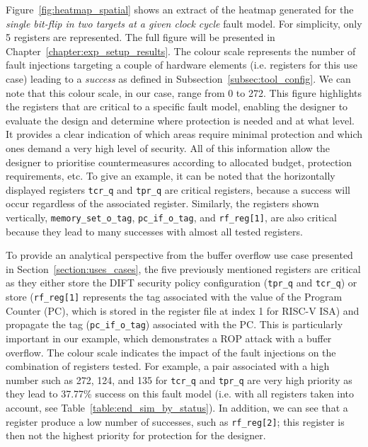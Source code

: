 Figure~\ref{fig:heatmap_spatial} shows an extract of the heatmap generated for the \textit{single bit-flip in two targets at a given clock cycle} fault model. For simplicity, only 5 registers are represented. The full figure will be presented in Chapter~\ref{chapter:exp_setup_results}.
The colour scale represents the number of fault injections targeting a couple of hardware elements (i.e. registers for this use case) leading to a \textit{success} as defined in Subsection~\ref{subsec:tool_config}. We can note that this colour scale, in our case, range from 0 to 272.
This figure highlights the registers that are critical to a specific fault model, enabling the designer to evaluate the design and determine where protection is needed and at what level. It provides a clear indication of which areas require minimal protection and which ones demand a very high level of security. All of this information allow the designer to prioritise countermeasures according to allocated budget, protection requirements, etc.
To give an example, it can be noted that the horizontally displayed registers \texttt{tcr\_q} and \texttt{tpr\_q} are critical registers, because a success will occur regardless of the associated register. Similarly, the registers shown vertically, \texttt{memory\_set\_o\_tag}, \texttt{pc\_if\_o\_tag}, and \texttt{rf\_reg[1]}, are also critical because they lead to many successes with almost all tested registers.

To provide an analytical perspective from the buffer overflow use case presented in Section~\ref{section:uses_cases}, the five previously mentioned registers are critical as they either store the DIFT security policy configuration (\texttt{tpr\_q} and \texttt{tcr\_q}) or store (\texttt{rf\_reg[1]} represents the tag associated with the value of the Program Counter (PC), which is stored in the register file at index 1 for RISC-V ISA) and propagate the tag (\texttt{pc\_if\_o\_tag}) associated with the PC. This is particularly important in our example, which demonstrates a ROP attack with a buffer overflow.
The colour scale indicates the impact of the fault injections on the combination of registers tested. For example, a pair associated with a high number such as 272, 124, and 135 for \texttt{tcr\_q} and \texttt{tpr\_q} are very high priority as they lead to 37.77\% success on this fault model (i.e. with all registers taken into account, see Table~\ref{table:end_sim_by_status}).
In addition, we can see that a register produce a low number of successes, such as \mbox{\texttt{rf\_reg[2]}}; this register is then not the highest priority for protection for the designer.

